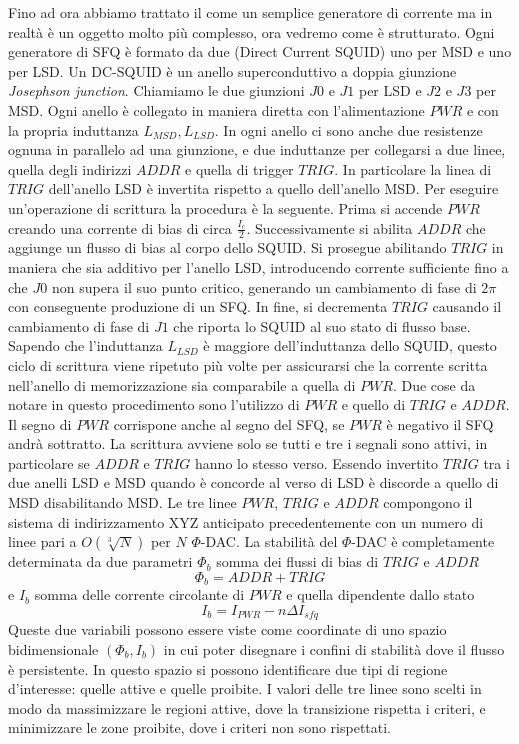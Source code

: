\cite{ACI}Fino ad ora abbiamo trattato il  come un semplice generatore di corrente ma in realtà è un oggetto molto più complesso, ora vedremo come è strutturato. Ogni generatore di SFQ è formato da due  (Direct Current SQUID) uno per MSD e uno per LSD. Un DC-SQUID è un anello superconduttivo a doppia giunzione \textit{Josephson junction}. Chiamiamo le due giunzioni $J0$ e $J1$ per LSD e $J2$ e $J3$ per MSD. Ogni anello è collegato in maniera diretta con l'alimentazione $PWR$ e con la propria induttanza $L_{MSD}, L_{LSD}$. In ogni anello ci sono anche due resistenze ognuna in parallelo ad una giunzione, e due induttanze per collegarsi a due linee, quella degli indirizzi $ADDR$ e quella di trigger $TRIG$. In particolare la linea di $TRIG$ dell'anello LSD è invertita rispetto a quello dell'anello MSD. Per eseguire un'operazione di scrittura la procedura è la seguente. Prima si accende $PWR$ creando una corrente di bias di circa $\frac{I_c}{2}$. Successivamente si abilita $ADDR$ che aggiunge un flusso di bias al corpo dello SQUID. Si prosegue abilitando $TRIG$ in maniera che sia additivo per l'anello LSD, introducendo corrente sufficiente fino a che $J0$ non supera il suo punto critico, generando un cambiamento di fase di $2\pi$ con conseguente produzione di un SFQ.
In fine, si decrementa $TRIG$ causando il cambiamento di fase di $J1$ che riporta lo SQUID al suo stato di flusso base. Sapendo che l'induttanza $L_{LSD}$ è maggiore dell'induttanza dello SQUID, questo ciclo di scrittura viene ripetuto più volte per assicurarsi che la corrente scritta nell'anello di memorizzazione sia comparabile a quella di $PWR$. Due cose da notare in questo procedimento sono l'utilizzo di $PWR$ e quello di $TRIG$ e $ADDR$. Il segno di $PWR$ corrispone anche al segno del SFQ, se $PWR$ è negativo il SFQ andrà sottratto. La scrittura avviene solo se tutti e tre i segnali sono attivi, in particolare se $ADDR$ e $TRIG$ hanno lo stesso verso. Essendo invertito $TRIG$ tra i due anelli LSD e MSD quando è concorde al verso di LSD è discorde a quello di MSD disabilitando MSD. Le tre linee $PWR$, $TRIG$ e $ADDR$ compongono il sistema di indirizzamento XYZ anticipato precedentemente con un numero di linee pari a $O(\sqrt[3]{N})$ per $N$ $\Phi$-DAC.
La stabilità del $\Phi$-DAC è completamente determinata da due parametri $\Phi_b$ somma dei flussi di bias di $TRIG$ e $ADDR$ $$\Phi_b = ADDR + TRIG$$
e $I_b$ somma delle corrente circolante di $PWR$ e quella dipendente dallo stato
$$I_b = I_{PWR} -n \Delta I_{sfq}$$
Queste due variabili possono essere viste come coordinate di uno spazio bidimensionale $(\Phi_b, I_b)$ in cui poter disegnare i confini di stabilità dove il flusso è persistente. In questo spazio si possono identificare due tipi di regione d'interesse: quelle attive e quelle proibite. I valori delle tre linee sono scelti in modo da massimizzare le regioni attive, dove la transizione rispetta i criteri, e minimizzare le zone proibite, dove i criteri non sono rispettati.
